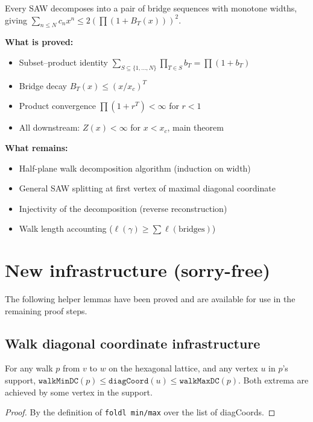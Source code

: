 \begin{lemma}
\begin{enumerate}
\begin{enumerate}
  Every SAW decomposes into a pair of bridge sequences with monotone widths,
  giving $\sum_{n \leq N} c_n x^n \leq 2 (\prod (1 + B_T(x)))^2$.

  \textbf{What is proved:}
  \begin{itemize}
  \item Subset--product identity $\sum_{S \subseteq \{1,\ldots,N\}} \prod_{T \in S} b_T = \prod (1 + b_T)$
  \item Bridge decay $B_T(x) \leq (x/x_c)^T$
  \item Product convergence $\prod(1 + r^T) < \infty$ for $r < 1$
  \item All downstream: $Z(x) < \infty$ for $x < x_c$, main theorem
  \end{itemize}

  \textbf{What remains:}
  \begin{itemize}
  \item Half-plane walk decomposition algorithm (induction on width)
  \item General SAW splitting at first vertex of maximal diagonal coordinate
  \item Injectivity of the decomposition (reverse reconstruction)
  \item Walk length accounting ($\ell(\gamma) \geq \sum \ell(\text{bridges})$)
  \end{itemize}
\end{enumerate}

\section{New infrastructure (sorry-free)}

The following helper lemmas have been proved and are available for use
in the remaining proof steps.

\subsection{Walk diagonal coordinate infrastructure}

\begin{lemma}\label{lem:walkMinDC}
\leanok
  For any walk $p$ from $v$ to $w$ on the hexagonal lattice,
  and any vertex $u$ in $p$'s support,
  $\texttt{walkMinDC}(p) \leq \texttt{diagCoord}(u) \leq \texttt{walkMaxDC}(p)$.
  Both extrema are achieved by some vertex in the support.
\end{lemma}
\begin{proof}\leanok
  By the definition of \texttt{foldl min/max} over the list of diagCoords.
\end{proof}


\end{enumerate}
\end{lemma}
